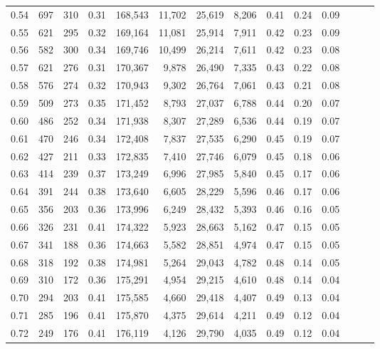 \begin{tabular}{rrrrrrrrrrrrrr}
0.54 &    697 &  310 &  0.31 &  168,543 &   11,702 &  25,619 &   8,206 &  0.41 &  0.24 &      0.09 \\
0.55 &    621 &  295 &  0.32 &  169,164 &   11,081 &  25,914 &   7,911 &  0.42 &  0.23 &      0.09 \\
0.56 &    582 &  300 &  0.34 &  169,746 &   10,499 &  26,214 &   7,611 &  0.42 &  0.23 &      0.08 \\
0.57 &    621 &  276 &  0.31 &  170,367 &    9,878 &  26,490 &   7,335 &  0.43 &  0.22 &      0.08 \\
0.58 &    576 &  274 &  0.32 &  170,943 &    9,302 &  26,764 &   7,061 &  0.43 &  0.21 &      0.08 \\
0.59 &    509 &  273 &  0.35 &  171,452 &    8,793 &  27,037 &   6,788 &  0.44 &  0.20 &      0.07 \\
0.60 &    486 &  252 &  0.34 &  171,938 &    8,307 &  27,289 &   6,536 &  0.44 &  0.19 &      0.07 \\
0.61 &    470 &  246 &  0.34 &  172,408 &    7,837 &  27,535 &   6,290 &  0.45 &  0.19 &      0.07 \\
0.62 &    427 &  211 &  0.33 &  172,835 &    7,410 &  27,746 &   6,079 &  0.45 &  0.18 &      0.06 \\
0.63 &    414 &  239 &  0.37 &  173,249 &    6,996 &  27,985 &   5,840 &  0.45 &  0.17 &      0.06 \\
0.64 &    391 &  244 &  0.38 &  173,640 &    6,605 &  28,229 &   5,596 &  0.46 &  0.17 &      0.06 \\
0.65 &    356 &  203 &  0.36 &  173,996 &    6,249 &  28,432 &   5,393 &  0.46 &  0.16 &      0.05 \\
0.66 &    326 &  231 &  0.41 &  174,322 &    5,923 &  28,663 &   5,162 &  0.47 &  0.15 &      0.05 \\
0.67 &    341 &  188 &  0.36 &  174,663 &    5,582 &  28,851 &   4,974 &  0.47 &  0.15 &      0.05 \\
0.68 &    318 &  192 &  0.38 &  174,981 &    5,264 &  29,043 &   4,782 &  0.48 &  0.14 &      0.05 \\
0.69 &    310 &  172 &  0.36 &  175,291 &    4,954 &  29,215 &   4,610 &  0.48 &  0.14 &      0.04 \\
0.70 &    294 &  203 &  0.41 &  175,585 &    4,660 &  29,418 &   4,407 &  0.49 &  0.13 &      0.04 \\
0.71 &    285 &  196 &  0.41 &  175,870 &    4,375 &  29,614 &   4,211 &  0.49 &  0.12 &      0.04 \\
0.72 &    249 &  176 &  0.41 &  176,119 &    4,126 &  29,790 &   4,035 &  0.49 &  0.12 &      0.04 \\

\end{tabular}
